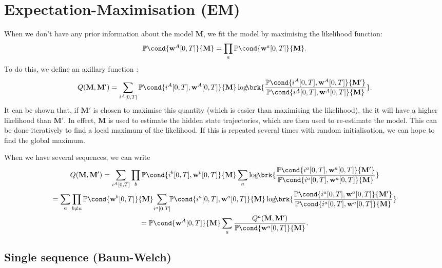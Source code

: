 \documentclass[12pt]{article}
\newcommand{\w}{\mathbf{w}}
\newcommand{\M}{\mathbf{M}}
\newcommand{\pr}{\mathbb{P}}
\begin{document}
\section{Expectation-Maximisation (EM) \label{sec:em}}

When we don't have any prior information about the model $\M$, we fit the model by maximising the likelihood function:
%
\begin{equation}\label{eq:like}
  \pr\cond{\w^A[0,T]}{\M} = \prod_a \pr\cond{\w^a[0,T]}{\M}.
\end{equation}
%
To do this, we define an axillary function \cite{Baum1970baumwelch,Dempster2007EM}:
%
\begin{equation}\label{eq:emq}
  Q(\M,\M') = \sum_{i^A[0,T]} \pr\cond{i^A[0,T],\w^A[0,T]}{\M} \log\!\! \brk{
      \frac{ \pr\cond{i^A[0,T],\w^A[0,T]}{\M'} }{ \pr\cond{i^A[0,T],\w^A[0,T]}{\M} } }.
\end{equation}
%
It can be shown that, if $\M'$ is chosen to maximise this quantity (which is easier than maximising the likelihood), the it will have a higher likelihood than $\M'$.
In effect, $\M$ is used to estimate the hidden state trajectories, which are then used to re-estimate the model.
This can be done iteratively to find a local maximum of the likelihood.
If this is repeated several times with random initialisation, we can hope to find the global maximum.

When we have several sequences, we can write
%
\begin{equation}\label{eq:emqseveral}
\begin{gathered}
  Q(\M,\M') = \sum_{i^A[0,T]}  \prod_b \pr\cond{i^b[0,T],\w^b[0,T]}{\M} \sum_a  \log\!\!  \brk{
      \frac{ \pr\cond{i^a[0,T],\w^a[0,T]}{\M'} }{ \pr\cond{i^a[0,T],\w^a[0,T]}{\M} } } \\
   = \sum_a \prod_{b \neq a} \pr\cond{\w^b[0,T]}{\M}\! \sum_{i^a[0,T]}\!\! \pr\cond{i^a[0,T],\w^a[0,T]}{\M} \log\!\!  \brk{
      \frac{ \pr\cond{i^a[0,T],\w^a[0,T]}{\M'} }{ \pr\cond{i^a[0,T],\w^a[0,T]}{\M} } } \\
   = \pr\cond{\w^A[0,T]}{\M} \sum_a \frac{Q^a(\M,\M')}{\pr\cond{\w^a[0,T]}{\M}}.
\end{gathered}
\end{equation}
%

\subsection{Single sequence (Baum-Welch) \label{sec:bw}}
\end{document}
